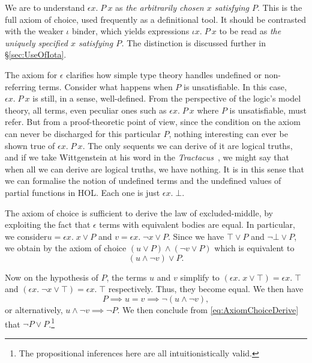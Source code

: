 We are to understand $\epsilon x.\; P\ x$ as \emph{the arbitrarily chosen $x$ satisfying $P$}. This is the full axiom of choice, used frequently as a definitional tool. It should be contrasted with the weaker $\iota$ binder, which yields expressions $\iota x.\; P\ x$ to be read as \emph{the uniquely specified $x$ satisfying $P$.} The distinction is discussed further in \S\ref{sec:UseOfIota}.

The axiom for $\epsilon$ clarifies how simple type theory handles undefined or non-referring terms. Consider what happens when $P$ is unsatisfiable. In this case, $\epsilon x.\; P\ x$ is still, in a sense, well-defined. From the perspective of the logic's model theory, all terms, even peculiar ones such as $\epsilon x.\; P\ x$ where $P$ is unsatisfiable, must refer. But from a proof-theoretic point of view, since the condition on the axiom can never be discharged for this particular $P$, nothing interesting can ever be shown true of $\epsilon x.\; P\ x$. The only sequents we can derive of it are logical truths, and if we take Wittgenstein at his word in the \emph{Tractacus}~\cite{ToWitNothing}, we might say that when all we can derive are logical truths, we have nothing. It is in this sense that we can formalise the notion of undefined terms and the undefined values of partial functions in HOL. Each one is just $\epsilon x.\; \bot$.

The axiom of choice is sufficient to derive the law of excluded-middle, by exploiting the fact that $\epsilon$ terms with equivalent bodies are equal. In particular, we consider\linebreak $u = \epsilon x.\; x \vee P$ and $v = \epsilon x.\; \neg x \vee P$. Since we have $\top \vee P$ and $\neg \bot \vee P$, we obtain by the axiom of choice $(u \vee P) \wedge (\neg v \vee P)$ which is equivalent to
\begin{equation}
 (u \wedge \neg v) \vee P.\label{eq:AxiomChoiceDerive}
\end{equation}

Now on the hypothesis of $P$, the terms $u$ and $v$ simplify to $(\epsilon x.\; x \vee \top) = \epsilon x.\; \top$ and $(\epsilon x.\; \neg x \vee \top) = \epsilon x.\; \top$ respectively. Thus, they become equal. We then have
\begin{displaymath}
P \implies u = v \implies \neg (u \wedge \neg v),
\end{displaymath}
or alternatively, $u \wedge \neg v \implies \neg P$. We then conclude from \eqref{eq:AxiomChoiceDerive} that $\neg P \vee P$.\footnote{The propositional inferences here are all intuitionistically valid.}

